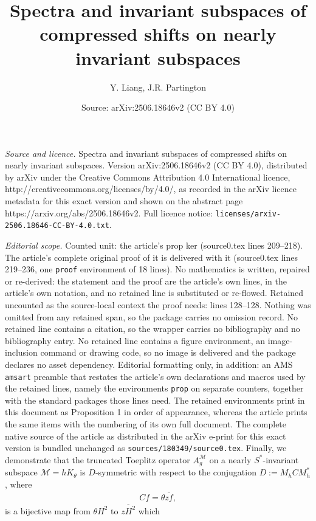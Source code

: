 \documentclass[10pt,a4paper]{amsart}
\title{Spectra and invariant subspaces of compressed shifts on nearly invariant subspaces}
\author{Y. Liang, J.R. Partington}
\date{Source: arXiv:2506.18646v2 (CC BY 4.0)}
\newcommand{\ma}{\mathcal}
\newcommand{\ol}{\overline}
\begin{document}
\maketitle

\noindent\emph{Source and licence.} Spectra and invariant subspaces of compressed shifts on nearly invariant subspaces. Version arXiv:2506.18646v2 (CC BY 4.0), distributed by arXiv under the Creative Commons Attribution 4.0 International licence, http://creativecommons.org/licenses/by/4.0/, as recorded in the arXiv licence metadata for this exact version and shown on the abstract page https://arxiv.org/abs/2506.18646v2. Full licence notice: \texttt{licenses/arxiv-2506.18646-CC-BY-4.0.txt}.\par\smallskip

\noindent\textit{Editorial scope.} Counted unit: the article's prop ker (source0.tex lines 209--218). The article's complete original proof of it is delivered with it (source0.tex lines 219--236, one \texttt{proof} environment of 18 lines). No mathematics is written, repaired or re-derived: the statement and the proof are the article's own lines, in the article's own notation, and no retained line is substituted or re-flowed.  Retained uncounted as the source-local context the proof needs: lines 128--128.  Nothing was omitted from any retained span, so the package carries no omission record.  No retained line contains a citation, so the wrapper carries no bibliography and no bibliography entry.  No retained line contains a figure environment, an image-inclusion command or drawing code, so no image is delivered and the package declares no asset dependency.  Editorial formatting only, in addition: an AMS \texttt{amsart} preamble that restates the article's own declarations and macros used by the retained lines, namely the environments \texttt{prop} on separate counters, together with the standard packages those lines need.  The retained environments print in this document as Proposition 1 in order of appearance, whereas the article prints the same items with the numbering of its own full document.  The complete native source of the article as distributed in the arXiv e-print for this exact version is bundled unchanged as \texttt{sources/180349/source0.tex}.
Finally, we demonstrate that the truncated Toeplitz operator $A_g^\ma{M}$ on a nearly $S^*$-invariant subspace  $\ma{M}=hK_\theta$ is $D$-symmetric with respect to the conjugation $D:=M_hCM_h^*$,  where  \begin{align}Cf=\theta \ol{z f},\label{Con} \end{align} is a bijective  map from $\theta H^2$ to $\ol{zH^2}$ which
\end{document}
